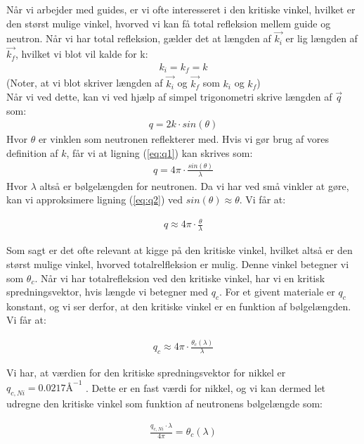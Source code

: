 \documentclass[12pt,oneside,a4paper]{article}
\begin{document}
{{{{{Når vi arbejder med guides, er vi ofte interesseret i den kritiske vinkel, hvilket er den størst mulige vinkel, hvorved vi kan få total refleksion mellem guide og neutron. Når vi har total refleksion, gælder det at længden af $\vec{k_i}$ er lig længden af $\vec{k_f}$, hvilket vi blot vil kalde for k:
\begin{align}
k_i=k_f=k
\end{align}
(Noter, at vi blot skriver længden af $\vec{k_i}$ og $\vec{k_f}$ som $k_i$ og $k_f$) \\
Når vi ved dette, kan vi ved hjælp af simpel trigonometri skrive længden af $\vec{q}$ som:
\begin{align} \label{eq:q1}
q=2k \cdot sin(\theta)
\end{align}
Hvor $\theta$ er vinklen som neutronen reflekterer med. Hvis vi gør brug af vores definition af $k$, får vi at ligning (\ref{eq:q1}) kan skrives som:
\begin{align} \label{eq:q2}
q=4\pi \cdot \frac{sin(\theta)}{\lambda}
\end{align}
Hvor $\lambda$ altså er bølgelængden for neutronen. Da vi har ved små vinkler at gøre, kan vi approksimere ligning (\ref{eq:q2})  ved $sin(\theta)≈\theta$. Vi får at:

\begin{align}
q≈4\pi \cdot \frac{\theta}{\lambda}
\end{align}

Som sagt er det ofte relevant at kigge på den kritiske vinkel, hvilket altså er den størst mulige vinkel, hvorved totalrelfleksion er mulig. Denne vinkel betegner vi som $\theta_c$. Når vi har totalrefleksion ved den kritiske vinkel, har vi en kritisk spredningsvektor, hvis længde vi betegner med $q_c$. For et givent materiale er $q_c$ konstant, og vi ser derfor, at den kritiske vinkel er en funktion af bølgelængden. Vi får at:

\begin{align}
q_c≈4\pi \cdot \frac{\theta_c(\lambda)}{\lambda}
\end{align}

Vi har, at værdien for den kritiske spredningsvektor for nikkel er $q_{c, Ni}=0.0217\text{Å} ^{-1}$ \cite{lefmann_arleth_kirkensgaard_lebech_thomsen}. Dette er en fast værdi for nikkel, og vi kan dermed let udregne den kritiske vinkel som funktion af neutronens bølgelængde som: 

\begin{align}
\frac{q_{c,Ni} \cdot \lambda}{4\pi}=\theta_c(\lambda)
\end{align}

}}}}}
\end{document}
